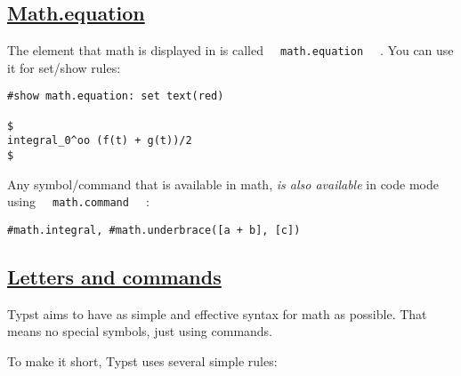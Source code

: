 \pandocbounded{}

\subsection{\texorpdfstring{\hyperref[mathequation]{Math.equation}}{Math.equation}}\label{mathequation}

The element that math is displayed in is called
\texttt{\ }{\texttt{\ math.equation\ }}\texttt{\ } . You can use it for
set/show rules:

\begin{verbatim}
#show math.equation: set text(red)

$
integral_0^oo (f(t) + g(t))/2
$
\end{verbatim}

\pandocbounded{}

Any symbol/command that is available in math, \emph{is also available}
in code mode using \texttt{\ }{\texttt{\ math.command\ }}\texttt{\ } :

\begin{verbatim}
#math.integral, #math.underbrace([a + b], [c])
\end{verbatim}

\pandocbounded{}

\subsection{\texorpdfstring{\hyperref[letters-and-commands]{Letters and
commands}}{Letters and commands}}\label{letters-and-commands}

Typst aims to have as simple and effective syntax for math as possible.
That means no special symbols, just using commands.

To make it short, Typst uses several simple rules:

